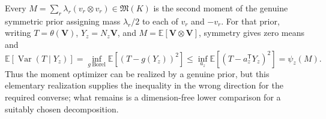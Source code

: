 Every \(M=\sum_r\lambda_r(v_r\otimes v_r)\in\mathfrak M(K)\) is the second moment of the genuine symmetric prior assigning mass \(\lambda_r/2\) to each of \(v_r\) and \(-v_r\).  For that prior, writing \(T=\theta(\mathbf V)\), \(Y_z=N_z\mathbf V\), and \(M=\mathbb E[\mathbf V\otimes\mathbf V]\), symmetry gives zero means and
\[
 \mathbb E[\operatorname{Var}(T\mid Y_z)]
 =\inf_{g\ \mathrm{Borel}}\mathbb E[(T-g(Y_z))^2]
 \le\inf_{a_z}\mathbb E[(T-a_z^{\mathsf T}Y_z)^2]
 =\psi_z(M).
\]
Thus the moment optimizer can be realized by a genuine prior, but this elementary realization supplies the inequality in the wrong direction for the required converse; what remains is a dimension-free lower comparison for a suitably chosen decomposition.